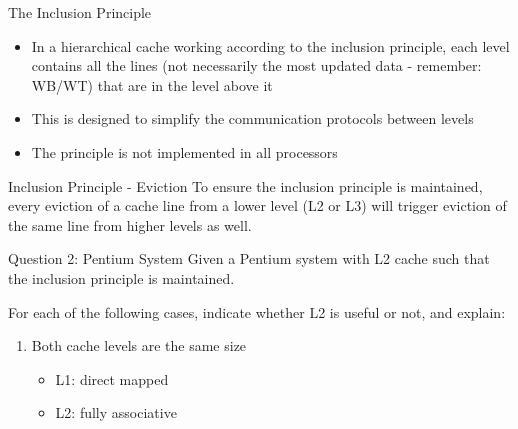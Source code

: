 \documentclass[aspectratio=169,12pt]{beamer}
\begin{document}
\begin{frame}{The Inclusion Principle}
\begin{itemize}
    \item In a hierarchical cache working according to the inclusion principle, each level contains all the lines (not necessarily the most updated data - remember: WB/WT) that are in the level above it
    \item This is designed to simplify the communication protocols between levels
    \item The principle is not implemented in all processors
\end{itemize}

\begin{center}
\end{center}
\end{frame}

\begin{frame}{Inclusion Principle - Eviction}
To ensure the inclusion principle is maintained, every eviction of a cache line from a lower level (L2 or L3) will trigger eviction of the same line from higher levels as well.

\begin{center}
\end{center}
\end{frame}

\begin{frame}{Question 2: Pentium System}
Given a Pentium system with L2 cache such that the inclusion principle is maintained.

For each of the following cases, indicate whether L2 is useful or not, and explain:

\begin{enumerate}
    \item Both cache levels are the same size
    \begin{itemize}
        \item L1: direct mapped
        \item L2: fully associative
    \end{itemize}
\end{enumerate}
\end{frame}
\end{document}
